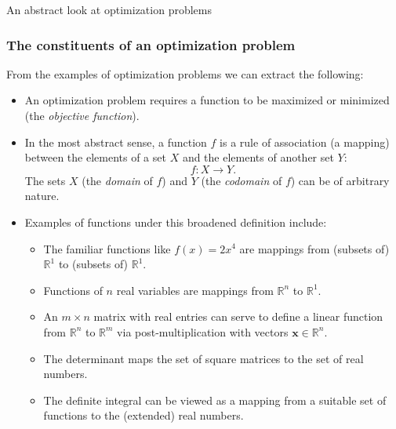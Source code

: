 \documentclass[10pt]{beamer}
\theoremstyle{definition}
\begin{document}
\begin{section}{An abstract look at optimization problems}
\begin{frame}[fragile]
\frametitle{The constituents of an optimization problem}
From the examples of optimization problems we can extract the following:
\begin{itemize} \itemsep1em
\item An optimization problem requires a function to be maximized or minimized (the \emph{objective function}).
\item In the most abstract sense, a function $ f $ is a rule of association (a mapping) between the elements of a set $ X $ and the elements of another set $ Y $:
\[ f: X \rightarrow Y. \] The sets $ X $ (the \emph{domain} of $ f $) and $ Y $ (the \emph{codomain} of $ f $) can be of arbitrary nature.
\item Examples of functions under this broadened definition include:
	\begin{itemize}
	\item The familiar functions like $ f(x) = 2x^4 $ are mappings from (subsets of) $ \mathbb{R}^1 $ to (subsets of) $ \mathbb{R}^1 $. 
	\item Functions of $ n $ real variables are mappings from $ \mathbb{R}^n $ to  $ \mathbb{R}^1 $.
	\item An $ m \times n $ matrix with real entries can serve to define a linear function from $ \mathbb{R}^n $ to $ \mathbb{R}^m $ via post-multiplication with vectors $ \mathbf{x} \in \mathbb{R}^n $.
	\item The determinant maps the set of square matrices to the set of real numbers.
	\item The definite integral can be viewed as a mapping from a suitable set of functions to the (extended) real numbers.
	\end{itemize}
\end{itemize}
\end{frame}


\end{section}
\end{document}
